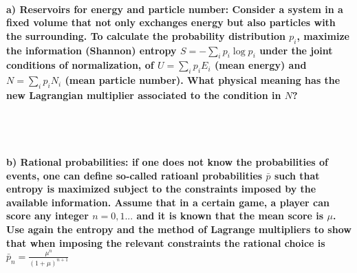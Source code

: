 \paragraph{a) Reservoirs for energy and particle number:
    Consider a system in a fixed volume that not only exchanges energy
    but also particles with the surrounding. To calculate the 
    probability distribution $p_i$, maximize the information 
    (Shannon) entropy $S=-\sum_ip_i\log{p_i}$ under the joint 
    conditions of normalization, of $U=\sum_ip_iE_i$ (mean energy) and 
    $N=\sum_ip_iN_i$ (mean particle number). What physical meaning has 
    the new Lagrangian multiplier associated to the condition in $N$?
} \ \\
\\

\paragraph{b) Rational probabilities: if one does not know the 
    probabilities of events, one can define so-called 
    ratioanl probabilities $\bar{p}$ such that entropy is maximized 
    subject to the constraints imposed by the available information.
    Assume that in a certain game, a player can score any integer 
    $n=0,1...$ and it is known that the mean score is $\mu$. Use again
    the entropy and the method of Lagrange multipliers to show that 
    when imposing the relevant constraints the rational choice is 
    $\bar{p}_n=\frac{\mu^n}{(1+\mu)^{n+1}}$
} \ \\
\\

